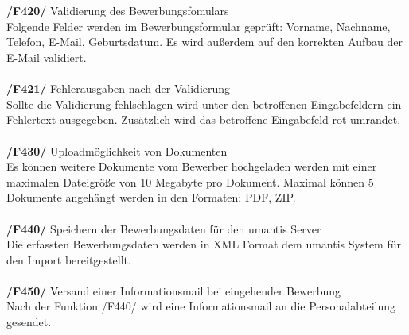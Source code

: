 \\ \\
\textbf{/F420/} Validierung des Bewerbungsfomulars \\
Folgende Felder werden im Bewerbungsformular geprüft: Vorname, Nachname, Telefon, E-Mail, Geburtsdatum. Es wird außerdem auf den korrekten Aufbau der E-Mail validiert.
\\ \\
\textbf{/F421/} Fehlerausgaben nach der Validierung \\
Sollte die Validierung fehlschlagen wird unter den betroffenen Eingabefeldern ein Fehlertext ausgegeben. Zusätzlich wird das betroffene Eingabefeld rot umrandet.
\\ \\
\textbf{/F430/} Uploadmöglichkeit von Dokumenten \\
Es können weitere Dokumente vom Bewerber hochgeladen werden mit einer maximalen Dateigröße von 10 Megabyte pro Dokument. Maximal können 5 Dokumente angehängt werden in den Formaten: PDF, ZIP.
\\ \\
\textbf{/F440/} Speichern der Bewerbungsdaten für den umantis Server \\
Die erfassten Bewerbungsdaten werden in XML Format dem umantis System für den Import bereitgestellt.
\\ \\
\textbf{/F450/} Versand einer Informationsmail bei eingehender Bewerbung \\
Nach der Funktion /F440/ wird eine Informationsmail an die Personalabteilung gesendet.
